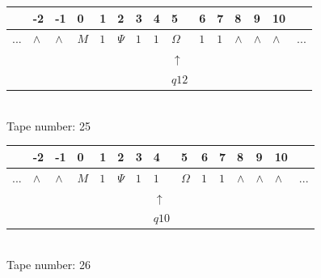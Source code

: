 \documentclass[11pt]{article}
\begin{document}
\begin{table}[H]
\centering
\begin{tabular}{lllllllllllllll}
 & -2 & -1 & 0 & 1 & 2 & 3 & 4 & 5 & 6 & 7 & 8 & 9 & 10 & \\
\hline
$...$ & \multicolumn{1}{|l|}{$\wedge$} & \multicolumn{1}{|l|}{$\wedge$} & \multicolumn{1}{|l|}{$M$} & \multicolumn{1}{|l|}{$1$} & \multicolumn{1}{|l|}{$\Psi$} & \multicolumn{1}{|l|}{$1$} & \multicolumn{1}{|l|}{$1$} & \multicolumn{1}{|l|}{$\Omega$} & \multicolumn{1}{|l|}{$1$} & \multicolumn{1}{|l|}{$1$} & \multicolumn{1}{|l|}{$\wedge$} & \multicolumn{1}{|l|}{$\wedge$} & \multicolumn{1}{|l|}{$\wedge$} & $...$\\
\hline
&  &  &  &  &  &  &  & $\uparrow$ &  &  &  &  &  &  \\
&  &  &  &  &  &  &  & $ q12 $ &  &  &  &  &  &  \\
\end{tabular}
\\
Tape number: 25
\noindent\makebox[\linewidth]{\hdashrule{\textwidth}{1pt}{1pt}}\end{table}

\begin{table}[H]
\centering
\begin{tabular}{lllllllllllllll}
 & -2 & -1 & 0 & 1 & 2 & 3 & 4 & 5 & 6 & 7 & 8 & 9 & 10 & \\
\hline
$...$ & \multicolumn{1}{|l|}{$\wedge$} & \multicolumn{1}{|l|}{$\wedge$} & \multicolumn{1}{|l|}{$M$} & \multicolumn{1}{|l|}{$1$} & \multicolumn{1}{|l|}{$\Psi$} & \multicolumn{1}{|l|}{$1$} & \multicolumn{1}{|l|}{$1$} & \multicolumn{1}{|l|}{$\Omega$} & \multicolumn{1}{|l|}{$1$} & \multicolumn{1}{|l|}{$1$} & \multicolumn{1}{|l|}{$\wedge$} & \multicolumn{1}{|l|}{$\wedge$} & \multicolumn{1}{|l|}{$\wedge$} & $...$\\
\hline
&  &  &  &  &  &  & $\uparrow$ &  &  &  &  &  &  &  \\
&  &  &  &  &  &  & $ q10 $ &  &  &  &  &  &  &  \\
\end{tabular}
\\
Tape number: 26
\noindent\makebox[\linewidth]{\hdashrule{\textwidth}{1pt}{1pt}}\end{table}
\end{document}
